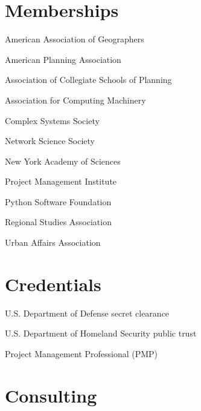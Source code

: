 \documentclass[12pt,letterpaper]{report}
\newcommand{\listitemspace}{0.25em}
\renewenvironment{itemize}
{\begin{list}{}{\setlength{\leftmargin}{0em}
                \setlength{\parskip}{0em}
                \setlength{\itemsep}{\listitemspace}
                \setlength{\parsep}{\listitemspace}}}
{\end{list}}
\begin{document}
    \section*{Memberships}

    \begin{itemize}

        \item American Association of Geographers
        \item American Planning Association
        \item Association of Collegiate Schools of Planning
        \item Association for Computing Machinery
        \item Complex Systems Society
        \item Network Science Society
        \item New York Academy of Sciences
        \item Project Management Institute
        \item Python Software Foundation
        \item Regional Studies Association
        \item Urban Affairs Association

    \end{itemize}



    \section*{Credentials}

    \begin{itemize}

        \item U.S. Department of Defense secret clearance
        \item U.S. Department of Homeland Security public trust
        \item Project Management Professional (PMP)

    \end{itemize}



    \section*{Consulting}
\end{document}
